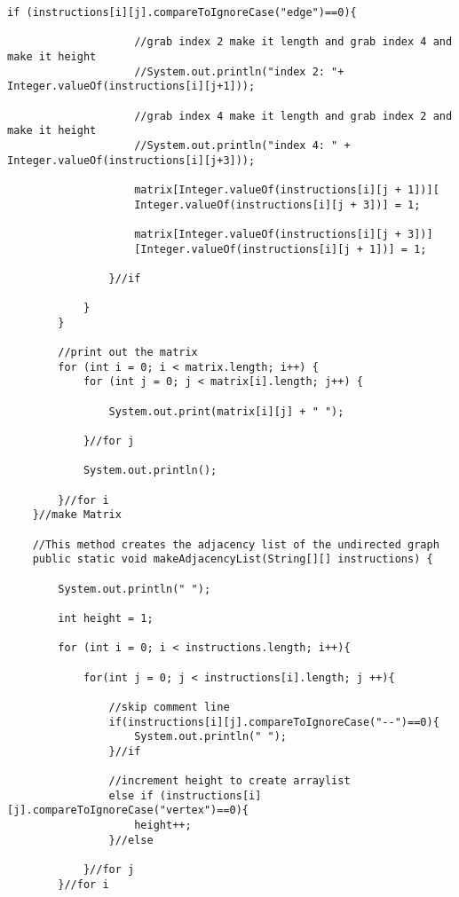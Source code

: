 \documentclass[letterpaper, 10pt,DIV=13]{scrartcl}
\numberwithin{equation}{section} %
\numberwithin{figure}{section} %
\numberwithin{table}{section} %
\begin{document}
\begin{lstlisting}[frame=single, ]
                if (instructions[i][j].compareToIgnoreCase("edge")==0){
                
                    //grab index 2 make it length and grab index 4 and make it height
                    //System.out.println("index 2: "+ Integer.valueOf(instructions[i][j+1]));

                    //grab index 4 make it length and grab index 2 and make it height
                    //System.out.println("index 4: " + Integer.valueOf(instructions[i][j+3]));
            
                    matrix[Integer.valueOf(instructions[i][j + 1])][
                    Integer.valueOf(instructions[i][j + 3])] = 1;
            
                    matrix[Integer.valueOf(instructions[i][j + 3])]
                    [Integer.valueOf(instructions[i][j + 1])] = 1;
                    
                }//if

            }
        }

        //print out the matrix
        for (int i = 0; i < matrix.length; i++) {
            for (int j = 0; j < matrix[i].length; j++) {

                System.out.print(matrix[i][j] + " ");

            }//for j

            System.out.println();

        }//for i
    }//make Matrix

    //This method creates the adjacency list of the undirected graph
    public static void makeAdjacencyList(String[][] instructions) {

        System.out.println(" ");

        int height = 1; 

        for (int i = 0; i < instructions.length; i++){

            for(int j = 0; j < instructions[i].length; j ++){

                //skip comment line
                if(instructions[i][j].compareToIgnoreCase("--")==0){
                    System.out.println(" ");
                }//if

                //increment height to create arraylist
                else if (instructions[i][j].compareToIgnoreCase("vertex")==0){
                    height++;
                }//else
            
            }//for j
        }//for i


\end{lstlisting}
\end{document}
